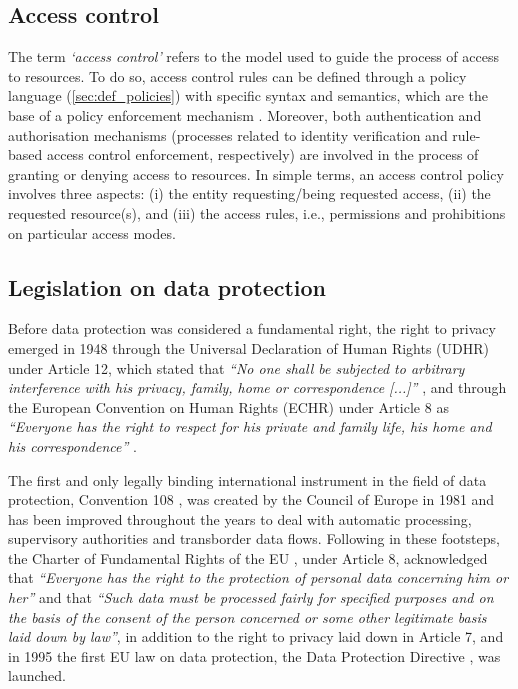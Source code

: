 \subsection{Access control}
\label{sec:def_access_control}

The term \textit{`access control'} refers to the model used to guide the process of access to resources. To do so, access control rules can be defined through a policy language (\ref{sec:def_policies}) with specific syntax and semantics, which are the base of a policy enforcement mechanism \citep{cuenca_grau_access_2017}. Moreover, both authentication and authorisation mechanisms (processes related to identity verification and rule-based access control enforcement, respectively) are involved in the process of granting or denying access to resources. In simple terms, an access control policy involves three aspects: (i) the entity requesting/being requested access, (ii) the requested resource(s), and (iii) the access rules, i.e., permissions and prohibitions on particular access modes.

\subsection{Legislation on data protection}
\label{sec:def_data_protection_law}

Before data protection was considered a fundamental right, the right to privacy emerged in 1948 through the Universal Declaration of Human Rights (UDHR) under Article 12, which stated that \textit{``No one shall be subjected to arbitrary interference with his privacy, family, home or correspondence [...]''} \citep{united_nations_general_assembly_universal_1948}, and through the European Convention on Human Rights (ECHR) under Article 8 as \textit{``Everyone has the right to respect for his private and family life, his home and his correspondence''} \citep{council_of_europe_european_1950}.

The first and only legally binding international instrument in the field of data protection, Convention 108 \citep{council_of_europe_convention_1981}, was created by the Council of Europe in 1981 and has been improved throughout the years to deal with automatic processing, supervisory authorities and transborder data flows.
Following in these footsteps, the Charter of Fundamental Rights of the EU \citeyearpar{noauthor_charter_2000}, under Article 8, acknowledged that \textit{``Everyone has the right to the protection of personal data concerning him or her''} and that \textit{``Such data must be processed fairly for specified purposes and on the basis of the consent of the person concerned or some other legitimate basis laid down by law''}, in addition to the right to privacy laid down in Article 7, and in 1995 the first EU law on data protection, the Data Protection Directive \citeyearpar{noauthor_directive_1995}, was launched.

